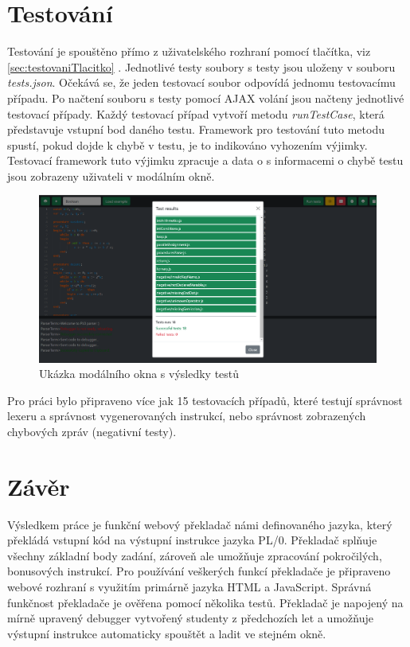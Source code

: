 \documentclass[12pt, letterpaper]{article}
\newcommand{\chapterRef}[1]{\ref{#1} \nameref{#1}}
\begin{document}
\section{Testování}\label{sec:testovani}
Testování je spouštěno přímo z uživatelského rozhraní pomocí tlačítka, viz \chapterRef{sec:testovaniTlacitko}. Jednotlivé testy soubory s testy jsou uloženy v souboru \textit{tests.json}. Očekává se, že jeden testovací soubor odpovídá jednomu testovacímu případu. Po načtení souboru s testy pomocí AJAX volání jsou načteny jednotlivé testovací případy. Každý testovací případ vytvoří metodu \textit{runTestCase}, která představuje vstupní bod daného testu. Framework pro testování tuto metodu spustí, pokud dojde k chybě v testu, je to indikováno vyhozením výjimky. Testovací framework tuto výjimku zpracuje a data o s informacemi o chybě testu jsou zobrazeny uživateli v modálním okně. 

\begin{figure}[H]
	\centering
	\includegraphics[width=\linewidth]{img/test_modal.png}
	\caption{Ukázka modálního okna s výsledky testů}
	\label{fig:TestModal}
\end{figure}

Pro práci bylo připraveno více jak 15 testovacích případů, které testují správnost lexeru a správnost vygenerovaných instrukcí, nebo správnost zobrazených chybových zpráv (negativní testy).
%
\section{Závěr}
Výsledkem práce je funkční webový překladač námi definovaného jazyka, který překládá vstupní kód na výstupní instrukce jazyka PL/0. Překladač splňuje všechny základní body zadání, zároveň ale umožňuje zpracování pokročilých, bonusových instrukcí. Pro používání veškerých funkcí překladače je připraveno webové rozhraní s využitím primárně jazyka HTML a JavaScript. Správná funkčnost překladače je ověřena pomocí několika testů. Překladač je napojený na mírně upravený debugger vytvořený studenty z předchozích let a umožňuje výstupní instrukce automaticky spouštět a ladit ve stejném okně. 
\end{document}
